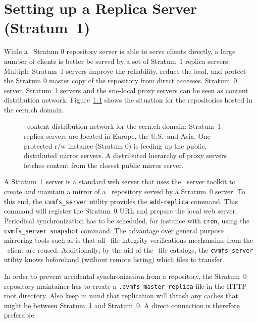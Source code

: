 \chapter{Setting up a Replica Server (Stratum~1)}
\label{sct:replica}

While a \cvmfs\ Stratum 0 repository server is able to serve clients directly, a large number of clients is better be served by a set of Stratum~1 replica servers.
Multiple Stratum~1 servers improve the reliability, reduce the load, and protect the Stratum 0 master copy of the repository from direct accesses.
Stratum~0 server, Stratum~1 servers and the site-local proxy servers can be seen as content distribution network.
Figure~\ref{fig:stratum1} shows the situation for the repositories hosted in the cern.ch domain.

\begin{figure}
	\begin{center}
		\resizebox{\textwidth}{!}{}
	\end{center}
	\caption{\cvmfs\ content distribution network for the cern.ch domain: Stratum~1 replica servers are located in Europe, the U.S.\ and Asia.  
		One protected r/w instance (Stratum 0) is feeding up the public, distributed mirror servers. 
		A distributed hierarchy of proxy servers fetches content from the closest public mirror server.}
	\label{fig:stratum1}
\end{figure}

A Stratum~1 server is a standard web server that uses the \cvmfs\ server toolkit to create and maintain a mirror of a \cvmfs\ repository served by a Stratum~0 server.
To this end, the \texttt{cvmfs\_server} utility provides the \texttt{add-replica} command.
This command will register the Stratum~0 URL and prepare the local web server.
Periodical synchronization has to be scheduled, for instance with \texttt{cron}, using the \texttt{cvmfs\_server snapshot} command.
The advantage over general purpose mirroring tools such as  is that all \cvmfs\ file integrity verifications mechansims from the \fuse\ client are reused.
Additionally, by the aid of the \cvmfs\ file catalogs, the \texttt{cvmfs\_server} utility knows beforehand (without remote listing) which files to transfer.

In order to prevent accidental synchronization from a repository, the Stratum~0 repository maintainer has to create a \texttt{.cvmfs\_master\_replica} file in the HTTP root directory.
Also keep in mind that replication will thrash any caches that might be between Stratum~1 and Stratum~0.
A direct connection is therefore preferable.

